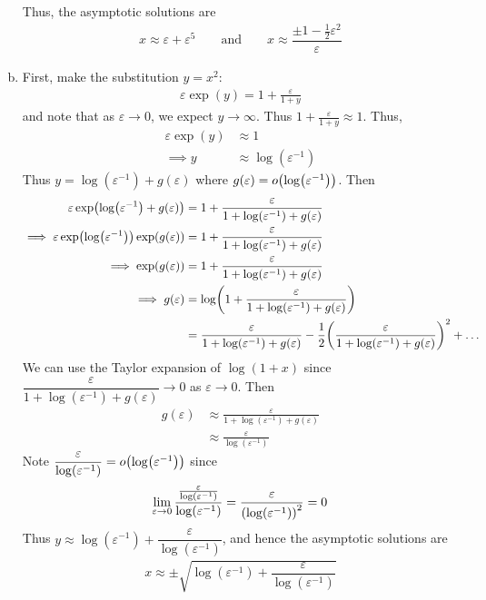 \documentclass{article} %
\theoremstyle{plain}
\newcommand{\E}{\varepsilon}
\numberwithin{equation}{section} %
\numberwithin{figure}{section} %
\numberwithin{table}{section} %
\begin{document}
\begin{enumerate}[(a)]
\begin{itemize}
        \end{itemize}
        Thus, the asymptotic solutions are
        \begin{align*}
            \boxed{x \approx \E + \E^5 \qquad \text{and} \qquad x \approx \dfrac{\pm 1 - \frac{1}{2}\E^2}{\E}}
        \end{align*}
    \item
        First, make the substitution $y = x^2$:
        \begin{align*}
            \E \exp(y) = 1 + \frac{\E}{1 + y}
        \end{align*}
        and note that as $\E \rightarrow 0$, we expect $y \rightarrow \infty$.  Thus $1 + \frac{\E}{1 + y} \approx 1$.  Thus,
        \begin{align*}
            \E \exp(y) &\approx 1 \\
            \implies y &\approx \log(\E^{-1})
        \end{align*}
        Thus $y = \log(\E^{-1}) + g(\E)$ where $g(\E) = o\qty(\log(\E^{-1}))$.  Then
        \begin{align*}
            \E\exp(\log(\E^{-1}) + g(\E)) &= 1 + \frac{\E}{1 + \log(\E^{-1}) + g(\E)} \\
            \implies \E\exp(\log(\E^{-1}))\exp(g(\E)) &= 1 + \frac{\E}{1 + \log(\E^{-1}) + g(\E)} \\
            \implies \exp(g(\E)) &= 1 + \frac{\E}{1 + \log(\E^{-1}) + g(\E)} \\
            \implies g(\E) &= \log(1 + \frac{\E}{1 + \log(\E^{-1}) + g(\E)}) \\
            &= \frac{\E}{1 + \log(\E^{-1}) + g(\E)} - \frac{1}{2}\qty(\frac{\E}{1 + \log(\E^{-1}) + g(\E)})^2 + \dots
        \end{align*}
        We can use the Taylor expansion of $\log(1 + x)$ since $\dfrac{\E}{1 + \log(\E^{-1}) + g(\E)} \rightarrow 0$ as $\E \rightarrow 0$.  Then
        \begin{align*}
            g(\E) &\approx \frac{\E}{1 + \log(\E^{-1}) + g(\E)} \\
            &\approx \frac{\E}{\log(\E^{-1})}
        \end{align*}
        Note $\dfrac{\E}{\log(\E^{-1})} = o\qty(\log(\E^{-1}))$ since
        \begin{align*}
            \lim_{\E \rightarrow 0} \frac{\frac{\E}{\log(\E^{-1})}}{\log(\E^{-1})} = \frac{\E}{\qty(\log(\E^{-1}))^2} = 0
        \end{align*}
        Thus $y \approx \log(\E^{-1}) + \dfrac{\E}{\log(\E^{-1})}$, and hence the asymptotic solutions are
        \begin{align*}
            \boxed{x \approx \pm \sqrt{\log(\E^{-1}) + \dfrac{\E}{\log(\E^{-1})}}}
        \end{align*}
\end{enumerate}
\end{document}
